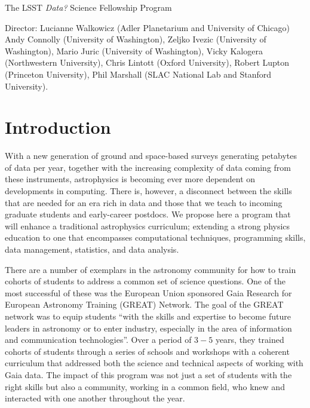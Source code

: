 \documentclass[nofootbib,floatfix,11pt]{article}
\begin{document}
 

\begin{center}
{\Large The  LSST {\em Data?} Science Fellowship Program}

Director: Lucianne Walkowicz (Adler Planetarium and University of Chicago)\\
Andy Connolly (University of Washington),  Zeljko Ivezic (University of Washington), Mario Juric  (University of Washington), Vicky Kalogera (Northwestern University), Chris Lintott (Oxford University), Robert Lupton (Princeton University), Phil Marshall (SLAC National Lab and Stanford University).

\end{center}

\bigskip

\section{Introduction}

With a new generation of ground and space-based surveys generating petabytes of data per year, together with the increasing complexity of data coming from these instruments, astrophysics is becoming ever more dependent on developments in computing. There is, however, a disconnect between the skills that are needed for an era rich in data and those that we teach to incoming graduate students and early-career postdocs. We propose here a program that will enhance a traditional astrophysics curriculum; extending a strong physics education to one that encompasses computational techniques, programming skills, data management, statistics, and data analysis.

There are a number of exemplars in the astronomy community for how to train cohorts of students to address a common set of science questions. One of the most successful of these was the European Union sponsored Gaia Research for European Astronomy Training (GREAT) Network. The goal of the GREAT network was to equip students ``with the skills and expertise to become future leaders in astronomy or to enter industry, especially in the area of information and communication technologies''.
Over a period of $3-5$ years, they trained cohorts of students through a series of schools and workshops with a coherent curriculum that addressed both the science and technical aspects of working with Gaia data. The impact of this program was not just a set of students with the right skills but also a community, working in a common field, who knew and interacted with one another throughout the year. 
\end{document}
